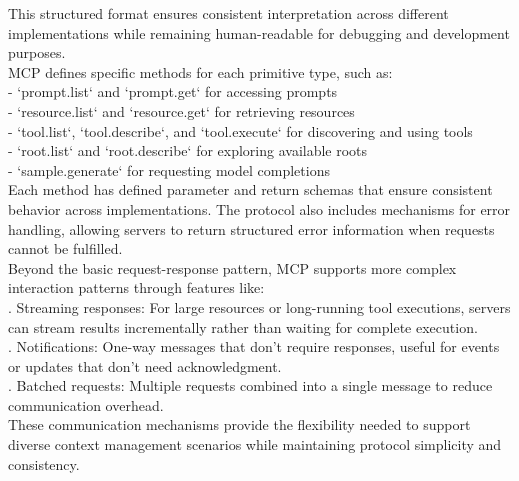 This structured format ensures consistent interpretation across different implementations while remaining human-readable for debugging and development purposes.\\ \newline
MCP defines specific methods for each primitive type, such as:\\ \newline
- `prompt.list` and `prompt.get` for accessing prompts\\ \newline
- `resource.list` and `resource.get` for retrieving resources\\ \newline
- `tool.list`, `tool.describe`, and `tool.execute` for discovering and using tools\\ \newline
- `root.list` and `root.describe` for exploring available roots\\ \newline
- `sample.generate` for requesting model completions\\ \newline
Each method has defined parameter and return schemas that ensure consistent behavior across implementations. The protocol also includes mechanisms for error handling, allowing servers to return structured error information when requests cannot be fulfilled.\\ \newline
Beyond the basic request-response pattern, MCP supports more complex interaction patterns through features like:\\ . Streaming responses: For large resources or long-running tool executions, servers can stream results incrementally rather than waiting for complete execution.\\ . Notifications: One-way messages that don't require responses, useful for events or updates that don't need acknowledgment.\\ . Batched requests: Multiple requests combined into a single message to reduce communication overhead.\\ \newline
These communication mechanisms provide the flexibility needed to support diverse context management scenarios while maintaining protocol simplicity and consistency.\\
